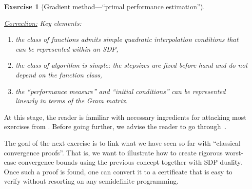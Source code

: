 \documentclass[11pt,a4paper]{article}
\newcommand{\correction}[1]{{{\color{blue}\underline{Correction:} #1}}}
\newcommand{\correction}[1]{}
\newtheorem{exercise}{Exercise}
\begin{document}
\begin{exercise}[Gradient method---``primal performance estimation'']
\begin{enumerate}
	\correction{ Key elements:
	\begin{enumerate}
	\item the class of functions admits simple quadratic interpolation conditions that can be represented within an SDP,
	\item the class of algorithm is simple: the stepsizes are fixed before hand and do not depend on the function class,
	\item the ``performance measure'' and ``initial conditions'' can be represented linearly in terms of the Gram matrix.
	\end{enumerate}
	
	}
	\end{enumerate}
	\end{exercise}

At this stage, the reader is familiar with necessary ingredients for attacking most exercises from . Before going further, we advise the reader to go through~. 

The goal of the next exercise is to link what we have seen so far with ``classical convergence proofs''. That is, we want to illustrate how to create rigorous worst-case convergence bounds using the previous concept together with SDP duality. Once such a proof is found, one can convert it to a certificate that is easy to verify without resorting on any semidefinite programming.
\end{document}
